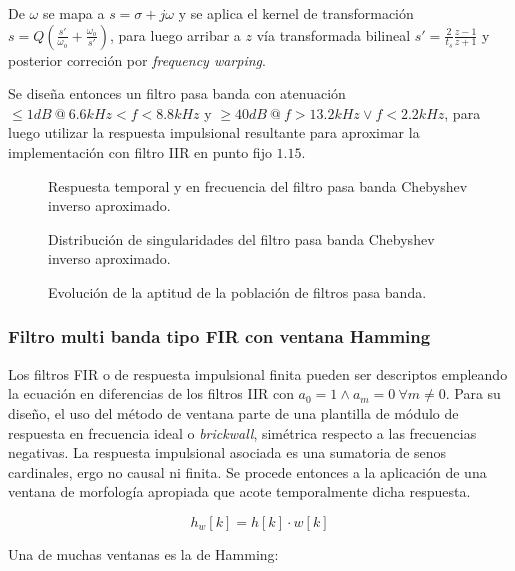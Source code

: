 \documentclass[11pt, journal]{IEEEtran}
\begin{document}
De \(\omega\) se mapa a \(s = \sigma + j\omega\) y se aplica el kernel
de transformación \(s = Q (\frac{s'}{\omega_o} + \frac{\omega_o}{s'})\),
para luego arribar a \(z\) vía transformada bilineal
\(s' = \frac{2}{t_s} \frac{z - 1}{z + 1}\) y posterior correción por
\emph{frequency warping}.

Se diseña entonces un filtro pasa banda con atenuación
\(\leq 1 dB\ @\ 6.6 kHz < f < 8.8 kHz\) y
\(\geq 40 dB\ @\ f > 13.2 kHz \lor f < 2.2 kHz\), para luego utilizar la
respuesta impulsional resultante para aproximar la implementación con
filtro IIR en punto fijo \(1.15\).


\begin{figure}
  \centering
  \caption{Respuesta temporal y en frecuencia del filtro pasa banda Chebyshev inverso aproximado.}
\end{figure}

\begin{figure}
  \centering
  \caption{Distribución de singularidades del filtro pasa banda Chebyshev inverso aproximado.}
\end{figure}
\vfill\null
\newpage
\begin{figure}
  \centering
  \caption{Evolución de la aptitud de la población de filtros pasa banda.}
\end{figure}

\subsubsection{Filtro multi banda tipo FIR con ventana Hamming}

Los filtros FIR o de respuesta impulsional finita pueden ser descriptos
empleando la ecuación en diferencias de los filtros IIR con
\(a_0 = 1 \land a_m = 0\ \forall m \neq 0\). Para su diseño, el uso del
método de ventana parte de una plantilla de módulo de respuesta en
frecuencia ideal o \emph{brickwall}, simétrica respecto a las
frecuencias negativas. La respuesta impulsional asociada es una
sumatoria de senos cardinales, ergo no causal ni finita. Se procede
entonces a la aplicación de una ventana de morfología apropiada que
acote temporalmente dicha respuesta.

\[
h_w[k] = h[k] \cdot w[k]
\]

Una de muchas ventanas es la de Hamming:
\end{document}
